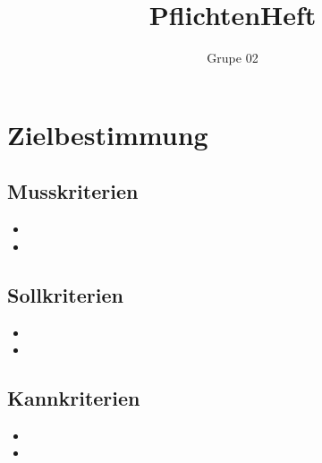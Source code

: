 \documentclass[10pt,a4paper]{article}
\author{Grupe 02}
\title{PflichtenHeft}
\begin{document}
\maketitle
\tableofcontents
\section{Zielbestimmung}
	\subsection{Musskriterien}
	\begin{itemize}
		\item 
		\item
	\end{itemize}
	\subsection{Sollkriterien}
	\begin{itemize}
			\item 
			\item
		\end{itemize}
	\subsection{Kannkriterien}
	\begin{itemize}
			\item 
			\item
		\end{itemize}
\end{document}
